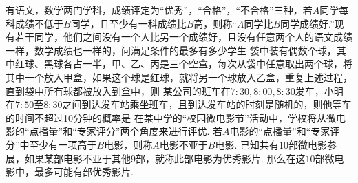 \documentclass{BHCexam}
\begin{document}
\begin{questions}
\qs 有语文，数学两门学科，成绩评定为“优秀”，“合格”，“不合格”三种，若$A$同学每科成绩不低于$B$同学，且至少有一科成绩比$B$高，则称“$A$同学比$ B $同学成绩好.”现有若干同学，他们之间没有一个人比另一个成绩好，且没有任意两个人的语文成绩一样，数学成绩也一样的，问满足条件的最多有多少学生\xx
{}
\qs
袋中装有偶数个球，其中红球、黑球各占一半，甲、乙、丙是三个空盒，每次从袋中任意取出两个球，将其中一个放入甲盒，如果这个球是红球，就将另一个球放入乙盒，重复上述过程，直到袋中所有球都被放入到盒中，则\xx
{}
\qs
某公司的班车在$ 7:30,8:00,8:30 $发车，小明在$ 7:50\text{至}8:30 $之间到达发车站乘坐班车，且到达发车站的时刻是随机的，则他等车的时间不超过10分钟的概率是\xx
{}
\qs 在某中学的“校园微电影节”活动中，学校将从微电影的“点播量”和“专家评分”两个角度来进行评优. 若$A$电影的“点播量”和“专家评分”中至少有一项高于$B$电影，则称$A$电影不亚于$B$电影. 已知共有$10$部微电影参展，如果某部电影不亚于其他$9$部，就称此部电影为优秀影片. 那么在这$10$部微电影中，最多可能有\tk 部优秀影片.


\end{questions}
\end{document}
